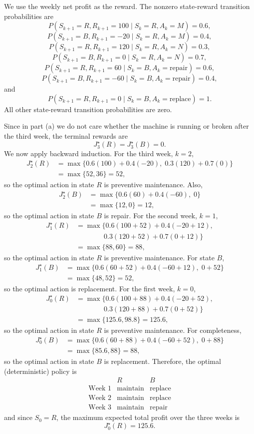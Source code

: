 \documentclass{article}
\begin{document}
We use the weekly net profit as the reward. The nonzero state-reward
transition probabilities are
\[
P(S_{k+1}=R,R_{k+1}=100\mid S_k=R,A_k=M)=0.6,
\]
\[
P(S_{k+1}=B,R_{k+1}=-20\mid S_k=R,A_k=M)=0.4,
\]
\[
P(S_{k+1}=R,R_{k+1}=120\mid S_k=R,A_k=N)=0.3,
\]
\[
P(S_{k+1}=B,R_{k+1}=0\mid S_k=R,A_k=N)=0.7,
\]
\[
P(S_{k+1}=R,R_{k+1}=60\mid S_k=B,A_k=\text{repair})=0.6,
\]
\[
P(S_{k+1}=B,R_{k+1}=-60\mid S_k=B,A_k=\text{repair})=0.4,
\]
and
\[
P(S_{k+1}=R,R_{k+1}=0\mid S_k=B,A_k=\text{replace})=1.
\]
All other state-reward transition probabilities are zero.

Since in part (a) we do not care whether the machine is running or broken
after the third week, the terminal rewards are
\[
J_3^\star(R)=J_3^\star(B)=0.
\]
We now apply backward induction.
For the third week, $k=2$,
\[\begin{aligned}
J_2^\star(R)
&=\max\{0.6(100)+0.4(-20),\;0.3(120)+0.7(0)\}\\
&=\max\{52,36\}=52,
\end{aligned}\]
so the optimal action in state $R$ is preventive maintenance. Also,
\[\begin{aligned}
J_2^\star(B)
&=\max\{0.6(60)+0.4(-60),\;0\}\\
&=\max\{12,0\}=12,
\end{aligned}\]
so the optimal action in state $B$ is repair.
For the second week, $k=1$,
\[\begin{aligned}
J_1^\star(R)
&=\max\{0.6(100+52)+0.4(-20+12),\\
&\qquad\qquad 0.3(120+52)+0.7(0+12)\}\\
&=\max\{88,60\}=88,
\end{aligned}\]
so the optimal action in state $R$ is preventive maintenance. For state $B$,
\[\begin{aligned}
J_1^\star(B)
&=\max\{0.6(60+52)+0.4(-60+12),\;0+52\}\\
&=\max\{48,52\}=52,
\end{aligned}\]
so the optimal action is replacement.
For the first week, $k=0$,
\[\begin{aligned}
J_0^\star(R)
&=\max\{0.6(100+88)+0.4(-20+52),\\
&\qquad\qquad 0.3(120+88)+0.7(0+52)\}\\
&=\max\{125.6,98.8\}=125.6,
\end{aligned}\]
so the optimal action in state $R$ is preventive maintenance. For completeness,
\[\begin{aligned}
J_0^\star(B)
&=\max\{0.6(60+88)+0.4(-60+52),\;0+88\}\\
&=\max\{85.6,88\}=88,
\end{aligned}\]
so the optimal action in state $B$ is replacement.
Therefore, the optimal (deterministic) policy is
\[\begin{array}{c|cc}
& R & B\\ \hline
\text{Week 1} & \text{maintain} & \text{replace}\\
\text{Week 2} & \text{maintain} & \text{replace}\\
\text{Week 3} & \text{maintain} & \text{repair}
\end{array}\]
and since $S_0=R$, the maximum expected total profit over the three weeks is
\[J_0^\star(R)=125.6.\]
\end{document}
